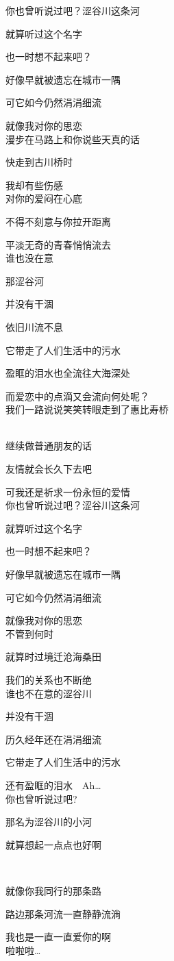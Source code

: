 你也曾听说过吧？涩谷川这条河

就算听过这个名字

也一时想不起来吧？

好像早就被遗忘在城市一隅

可它如今仍然涓涓细流

就像我对你的思恋
\\

漫步在马路上和你说些天真的话

快走到古川桥时

我却有些伤感
\\

对你的爱闷在心底

不得不刻意与你拉开距离

平淡无奇的青春悄悄流去
\\

谁也没在意

那涩谷河

并没有干涸

依旧川流不息

它带走了人们生活中的污水

盈眶的泪水也全流往大海深处

而爱恋中的点滴又会流向何处呢？
\\

我们一路说说笑笑转眼走到了惠比寿桥

\\

继续做普通朋友的话

友情就会长久下去吧

可我还是祈求一份永恒的爱情
\\

你也曾听说过吧？涩谷川这条河

就算听过这个名字

也一时想不起来吧？

好像早就被遗忘在城市一隅

可它如今仍然涓涓细流

就像我对你的思恋
\\

不管到何时

就算时过境迁沧海桑田

我们的关系也不断绝
\\

谁也不在意的涩谷川

并没有干涸

历久经年还在涓涓细流

它带走了人们生活中的污水

还有盈眶的泪水　Ah…
\\

你也曾听说过吧?

那名为涩谷川的小河

就算想起一点点也好啊


就像你我同行的那条路

路边那条河流一直静静流淌

我也是一直一直爱你的啊
\\

啦啦啦…
\\
